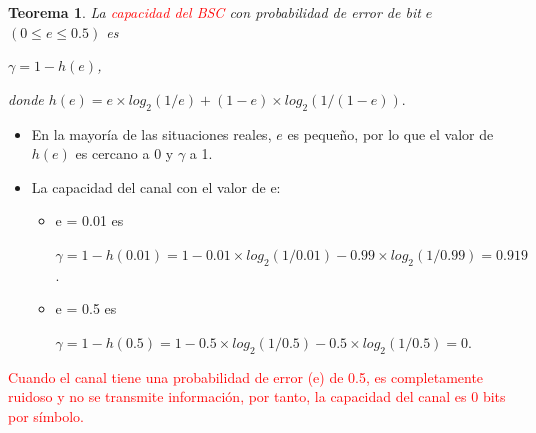 \documentclass{beamer}
\theoremstyle{plain}
\newtheorem{teorema} [Teorema] {Teorema}
\theoremstyle{example}
\theoremstyle{example}
\begin{document}
\begin{frame}  \small  


\begin{teorema}
La \textcolor{red}{capacidad del BSC} con probabilidad de error de bit $e$  $(0 \leq e \leq 0.5 )$ es

\begin{center}
$\gamma = 1-h(e)$,
\end{center}

donde $h(e) = e \times log_2(1/e) + (1 - e) \times  log_2 (1/(1 - e)).$
\end{teorema}
\begin{itemize}  
\item  En la mayoría de las situaciones reales, $e$ es pequeño, por lo que el valor de $h(e)$ es cercano a 0 y $\gamma$ a 1.


\item La capacidad del canal con el valor de e:
\begin{itemize}  

\item  e = 0.01 es 

\begin{center}
$\gamma = 1 - h(0.01)	= 1 - 0.01 \times  log_2(1/0.01) - 0.99 \times log_2(1/0.99) = 0.919$.
\end{center}

\item  e = 0.5 es 

\begin{center}
$\gamma = 1 - h(0.5)	= 1 - 0.5 \times  log_2(1/0.5) - 0.5 \times log_2(1/0.5) = 0$.
\end{center}
\end{itemize}
\end{itemize}

\textcolor{red}{Cuando el canal tiene una probabilidad de error (e) de 0.5, es completamente ruidoso y no se transmite información, por tanto, la capacidad del canal es 0 bits por símbolo.}
\end{frame} 
\end{document}
